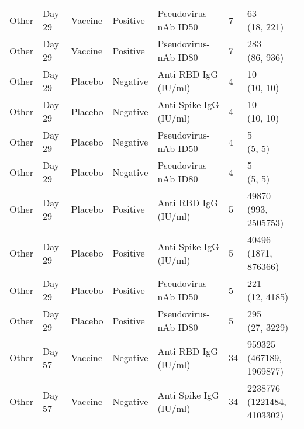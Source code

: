 \documentclass[]{book}
\theoremstyle{definition}
\theoremstyle{definition}
\theoremstyle{definition}
\newcommand{\1}{\mathbbm{1}}
\begin{document}
\begin{landscape}
\begin{ThreePartTable}
\begin{longtable}[t]{>{\raggedright\arraybackslash}p{7cm}llllll}
\hspace{1em}Other & Day 29 & Vaccine & Positive & Pseudovirus-nAb ID50 & 7 & \makecell[l]{63\\(18, 221)}\\
\hspace{1em}Other & Day 29 & Vaccine & Positive & Pseudovirus-nAb ID80 & 7 & \makecell[l]{283\\(86, 936)}\\
\hspace{1em}Other & Day 29 & Placebo & Negative & Anti RBD IgG (IU/ml) & 4 & \makecell[l]{10\\(10, 10)}\\
\hspace{1em}Other & Day 29 & Placebo & Negative & Anti Spike IgG (IU/ml) & 4 & \makecell[l]{10\\(10, 10)}\\
\hspace{1em}Other & Day 29 & Placebo & Negative & Pseudovirus-nAb ID50 & 4 & \makecell[l]{5\\(5, 5)}\\
\hspace{1em}Other & Day 29 & Placebo & Negative & Pseudovirus-nAb ID80 & 4 & \makecell[l]{5\\(5, 5)}\\
\hspace{1em}Other & Day 29 & Placebo & Positive & Anti RBD IgG (IU/ml) & 5 & \makecell[l]{49870\\(993, 2505753)}\\
\hspace{1em}Other & Day 29 & Placebo & Positive & Anti Spike IgG (IU/ml) & 5 & \makecell[l]{40496\\(1871, 876366)}\\
\hspace{1em}Other & Day 29 & Placebo & Positive & Pseudovirus-nAb ID50 & 5 & \makecell[l]{221\\(12, 4185)}\\
\hspace{1em}Other & Day 29 & Placebo & Positive & Pseudovirus-nAb ID80 & 5 & \makecell[l]{295\\(27, 3229)}\\
\hspace{1em}Other & Day 57 & Vaccine & Negative & Anti RBD IgG (IU/ml) & 34 & \makecell[l]{959325\\(467189, 1969877)}\\
\hspace{1em}Other & Day 57 & Vaccine & Negative & Anti Spike IgG (IU/ml) & 34 & \makecell[l]{2238776\\(1221484, 4103302)}\\

\end{longtable}
\end{ThreePartTable}
\end{landscape}
\end{document}
